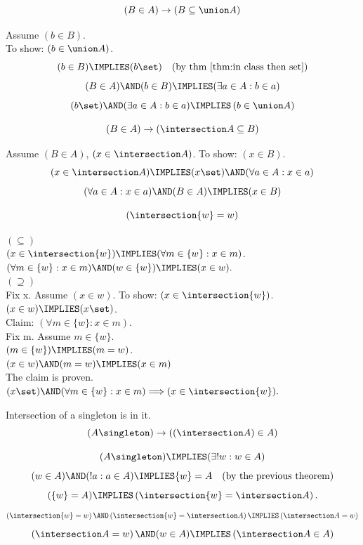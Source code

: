 \def\topic{}


\begin{theorem}
\[
(B\in A) \rightarrow \left(B \subseteq \union A\right)
\]
\end{theorem}
\Proof
Assume $(b\in B)$.\\
To show: $(b\in \union A)$.\\
\[
(b\in B)
\IMPLIES
(b\set)
\quad\mbox{(by thm \ref{thm:in class then set})}
\]
\[
(B\in A)
\AND
(b\in B)
\IMPLIES
(\exists a\in A : b\in a)
\]
\[
(b\set)
\AND
(\exists a\in A : b\in a)
\IMPLIES
\left(b\in \union A\right)
\]
\Done
\begin{theorem}
\[
(B\in A) \rightarrow \left(\intersection A\subseteq B\right)
\]
\end{theorem}
\Proof
Assume $(B\in A)$, $(x\in \intersection A)$. To show: $(x\in B)$.
\[
(x\in \intersection A)
\IMPLIES
(x\set)
\AND
(\forall a\in A : x\in a)
\]
\[
(\forall a\in A : x\in a)
\AND
(B\in A)
\IMPLIES
(x\in B)
\]
\Done

\begin{theorem}
\[\left(\intersection\{w\}=w\right)\]
\end{theorem}
\Proof
$(\subseteq)$\\
$(x\in\intersection \{w\})\IMPLIES(\forall m\in\{w\}:x\in m)$.\\
$(\forall m\in\{w\}:x\in m)\AND(w\in \{w\})\IMPLIES(x\in w).$\\
$(\supseteq)$\\
Fix x. Assume $(x\in w)$. To show: $(x\in\intersection\{w\})$.\\
$(x\in w)\IMPLIES(x\set)$.\\
Claim: $(\forall m\in\{w\}:x\in m).$\\
Fix m. Assume $m\in\{w\}$.\\
$(m\in\{w\})\IMPLIES(m=w)$.\\
$(x\in w)\AND(m=w)\IMPLIES(x\in m)$\\
The claim is proven.\\
$(x\set)\AND(\forall m\in\{w\}:x\in m) \Longrightarrow (x\in\intersection\{w\}).$\\
\Done

\begin{theorem}{Intersection of a singleton is in it.}
\label{thm:intersection of singleton}%
\[
(A \singleton) \rightarrow \left(\left(\intersection A\right)\in A\right)
\]
\end{theorem}
\Proof
\[(A\singleton)\IMPLIES(\exists!w:w\in A)\]
\[(w\in A)\AND(!a:a\in A)\IMPLIES\{w\}=A\quad\mbox{(by the previous theorem)}\]
\[(\{w\}=A)\IMPLIES\left(\intersection\{w\}=\intersection A\right).\]
\[\left(\intersection\{w\}=w\right)\AND\left(\intersection\{w\}=\intersection A\right)\IMPLIES\left(\intersection A=w\right)\]
\[\left(\intersection A=w\right)\AND(w\in A)\IMPLIES\left(\intersection A\in A\right)\]
\Done


